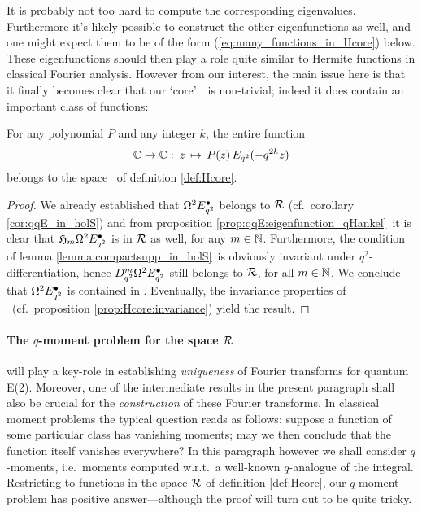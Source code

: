 \vspace{2ex}
It is probably not too hard to compute the corresponding eigenvalues.
Furthermore it's likely possible to construct the other eigenfunctions as
well, and one might expect them to be of the form (\ref{eq:many_functions_in_Hcore}) below.
These eigenfunctions should then play a role quite similar to Hermite
functions in classical Fourier analysis.
However from our interest, the main issue here is that it finally becomes clear that
our \lq core\rq\ \Hcore\ is non-trivial; indeed it does contain an important class of
functions:

\begin{cor} \label{cor:qExp_in_Hcore}
For any polynomial $P$ and any integer $k$, the entire function
\begin{equation}\label{eq:many_functions_in_Hcore}
  \mathbb{C} \rightarrow \mathbb{C} : \: z \,\mapsto \, P(z)\, E_{q^2}(-q^{2k} z)
\end{equation}
belongs to the space \Hcore\ of definition \ref{def:Hcore}.
\end{cor}
\begin{proof}
We already established that $\Omega^2 E_{q^2}^\bullet$ belongs to $\mathcal R$
(cf.\ corollary \ref{cor:qqE_in_holS}) and from
proposition \ref{prop:qqE:eigenfunction_qHankel}\
it is clear that $\mathfrak{H}_{m} \Omega^2 E_{q^2}^\bullet$ is in $\mathcal R$ as well,
for any $m\in \mathbb{N}$. Furthermore, the condition of lemma
\ref{lemma:compactsupp_in_holS}\ is obviously invariant under $q^2$-differentiation,
hence $D_{q^2}^m \Omega^2 E_{q^2}^\bullet$ still belongs to $\mathcal R$, for all $m\in \mathbb{N}$.
We conclude that $\Omega^2 E_{q^2}^\bullet$ is contained in \Hcore\@.
Eventually, the invariance properties of \Hcore\
(cf.\ proposition \ref{prop:Hcore:invariance}) yield the result.
\end{proof}




\paragraph{The $q$-moment problem for the space $\mathcal R$}
will play a key-role in establishing {\em uniqueness\/} of Fourier transforms
for quantum E(2). Moreover, one of the intermediate results in
the present paragraph shall also be crucial for the {\em construction\/} of
these Fourier transforms.
In classical moment problems the typical question reads as follows:
suppose a function of some particular class has vanishing moments;
may we then conclude that the function itself vanishes everywhere?
In this paragraph however we shall consider \mbox{$q$-moments},
i.e.\ moments computed w.r.t.\ a well-known $q$-analogue of the integral.
Restricting to functions in the space $\mathcal R$ of definition \ref{def:Hcore},
our $q$-moment problem has positive answer---although the proof will turn out
to be quite tricky.

